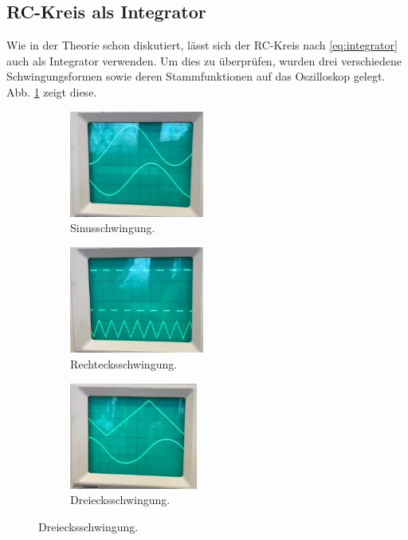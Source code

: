 \subsection{RC-Kreis als Integrator}
Wie in der Theorie schon diskutiert, lässt sich der RC-Kreis nach \autoref{eq:integrator} auch als Integrator verwenden. 
Um dies zu überprüfen, wurden drei verschiedene Schwingungsformen sowie deren Stammfunktionen auf das Oszilloskop gelegt.
Abb. \ref{fig:integration} zeigt diese.
\begin{figure}
    \begin{subfigure}{0.32\textwidth}
        \includegraphics[height=3.5cm]{messdaten/cos_int.png}
        \caption{Sinusschwingung.}
    \end{subfigure}
    \hfill
    \begin{subfigure}{0.32\textwidth}
        \includegraphics[height=3.5cm]{messdaten/dre_int.png}
        \caption{Rechtecksschwingung.}
    \end{subfigure}
    \hfill
    \begin{subfigure}{0.32\textwidth}
        \includegraphics[height=3.5cm]{messdaten/sin_int.png}
        \caption{Dreiecksschwingung.}
    \end{subfigure}  
    \label{fig:integration}
\end{figure}   
        
         
         
         
         
         
                 
         
         
         
        